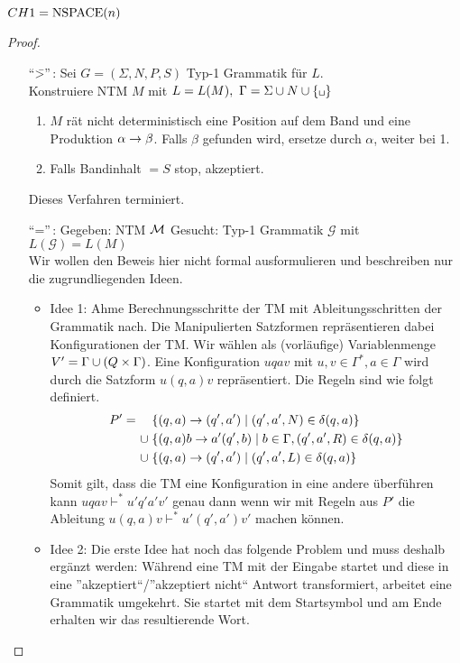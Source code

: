 \begin{Satz}\label{satz:6.3}
	$CH{1}=\operatorname{NSPACE}(n)$
\end{Satz}
\begin{proof}\
\begin{itemize}
	\item["`\=>"'\,:] Sei $G=(\Sigma,N,P,S)$ Typ-1 Grammatik für $L$.\\
		Konstruiere \ac{NTM} $M$ mit $L=L(M),\ \Gamma = \Sigma\cup N\cup\{\blank\}$
		\begin{enumerate}
		\item $M$ rät nicht deterministisch eine Position auf
                  dem Band und eine Produktion $\alpha\-> \beta$. Falls $\beta$ gefunden wird, ersetze durch $\alpha$, weiter bei 1.
		\item Falls Bandinhalt $=S$ \quad stop, akzeptiert.
		\end{enumerate}
		Dieses Verfahren terminiert.
	\item["`\<="'\,:] %
	Gegeben: \ac{NTM} $\mathcal{M}$ 
	Gesucht: Typ-1 Grammatik $\mathcal{G}$ mit $L(\mathcal{G})=L(M)$\\
	Wir wollen den Beweis hier nicht formal ausformulieren und beschreiben nur die zugrundliegenden Ideen.
	\begin{itemize}
	\item Idee 1:
	Ahme Berechnungsschritte der \ac{TM} mit Ableitungsschritten der Grammatik nach.
	Die Manipulierten Satzformen repräsentieren dabei Konfigurationen der TM.
	Wir wählen als (vorläufige) Variablenmenge $V'=\Gamma\cup(Q\times\Gamma)$.
	Eine Konfiguration $uqav$ mit $u,v\in\Gamma^*,a\in\Gamma$ wird durch die Satzform $u(q,a)v$ repräsentiert.
	Die Regeln sind wie folgt definiert.
	\begin{align*}
	 P' = \quad &\; \{ (q,a) \-> (q',a') \mid (q',a',N)\in \delta(q,a)\}\\
	 \cup &\; \{ (q,a)b \-> a'(q',b) \mid b\in\Gamma, (q',a',R)\in \delta(q,a) \}\\
	 \cup &\; \{ (q,a) \-> (q',a') \mid (q',a',L)\in \delta(q,a)\}
	\end{align*}
    Somit gilt, dass die \ac{TM} eine Konfiguration in eine andere überführen kann $uqav \vdash^{*} u'q'a'v'$
    genau dann wenn wir mit Regeln aus $P'$ die Ableitung $u(q,a)v \vdash^{*} u'(q',a')v'$ machen können.

	
	\item Idee 2:
	Die erste Idee hat noch das folgende Problem und muss deshalb ergänzt werden:
	Während eine \ac{TM} mit der Eingabe startet und diese in eine ''akzeptiert``/''akzeptiert nicht`` Antwort transformiert,
	arbeitet eine Grammatik umgekehrt. 
	Sie startet mit dem Startsymbol und am Ende erhalten wir das resultierende Wort.
	

\end{itemize}
\end{itemize}
\end{proof}
